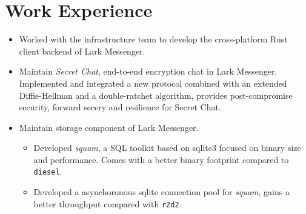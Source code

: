 \documentclass{resume}
\newcommand{\en}[1]{#1}
\newcommand{\zh}[1]{}
\begin{document}
\section{\en{Work Experience}\zh{工作经历}}
\en{}
\zh{\datedsubsection{\textbf{\href{https://www.bytedance.com/}{字节跳动}}}{09/2021 -- 至今}}
\en{}
\zh{\role{飞书跨平台基础架构}{Rust 研发实习}}
\begin{itemize}
      \item \en{
                Worked with the infrastructure team to develop the cross-platform 
                Rust client backend of Lark Messenger.
            }
            \zh{合作开发飞书客户端的跨平台 Rust SDK。}
      \item \en{
                Maintain \textit{Secret Chat}, end-to-end encryption chat in Lark Messenger.
                Implemented and integrated a new protocol combined with an extended 
                Diffie-Hellman and a double-ratchet algorithm, provides post-compromise 
                security, forward secery and resilience for Secret Chat.}
            \zh{
                维护飞书端到端加密聊天功能 “密聊”。实现并集成了一套新加密协议，通过结合扩展的 
                Diffie-Hellman 算法以及双棘轮算法，保证了聊天的后向安全性、前向安全性以及抵抗重放攻击的能力。
            }
      \item \en{
                Maintain storage component of Lark Messenger.
            }
            \zh{
                维护飞书 SDK 的存储组件。
            }
      \begin{itemize}
                  \item \en{
                            Developed \textit{squam}, a SQL toolkit based on sqlite3 focused on binary size and performance.
                            Comes with a better binary footprint compared to \texttt{diesel}.
                        }
                        \zh{
                            开发了 \textit{squam}，一个基于 sqlite3 的 SQL 工具库，专注于二进制大小和性能。在测试中，相较于 \texttt{diesel}，\textit{squam} 的二进制体积更小，编译时间更短。
                        }
                  \item \en{
                            Developed a asynchoronous sqlite connection pool for \textit{squam}, gains a better throughput compared with \texttt{r2d2}.
                        }
                        \zh{
                            为 \textit{squam} 开发了一个异步的 sqlite 连接池，相较于 \texttt{r2d2}，\texttt{squam} 的吞吐量更高。
}
\end{itemize}
\end{itemize}
\end{document}
